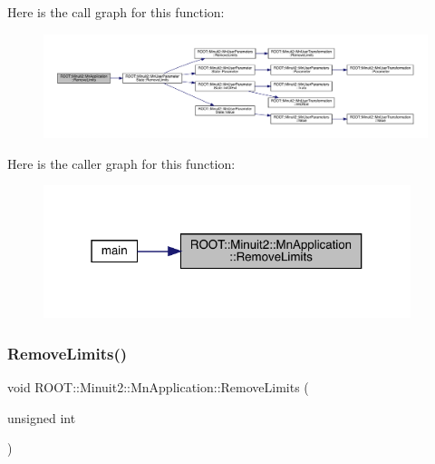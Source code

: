 Here is the call graph for this function\+:
\nopagebreak
\begin{figure}[H]
\begin{center}
\leavevmode
\includegraphics[width=350pt]{df/dd5/classROOT_1_1Minuit2_1_1MnApplication_a2c99043d2263ae51967867e1a26d4e30_cgraph}
\end{center}
\end{figure}
Here is the caller graph for this function\+:
\nopagebreak
\begin{figure}[H]
\begin{center}
\leavevmode
\includegraphics[width=304pt]{df/dd5/classROOT_1_1Minuit2_1_1MnApplication_a2c99043d2263ae51967867e1a26d4e30_icgraph}
\end{center}
\end{figure}
\mbox{\label{classROOT_1_1Minuit2_1_1MnApplication_a2c99043d2263ae51967867e1a26d4e30}} 
\subsubsection{\texorpdfstring{RemoveLimits()}{RemoveLimits()}\hspace{0.1cm}{\footnotesize\ttfamily [2/6]}}
{\footnotesize\ttfamily void R\+O\+O\+T\+::\+Minuit2\+::\+Mn\+Application\+::\+Remove\+Limits (\begin{DoxyParamCaption}\item[{unsigned int}]{ }\end{DoxyParamCaption})}

\mbox{\label{classROOT_1_1Minuit2_1_1MnApplication_a2c99043d2263ae51967867e1a26d4e30}} 
